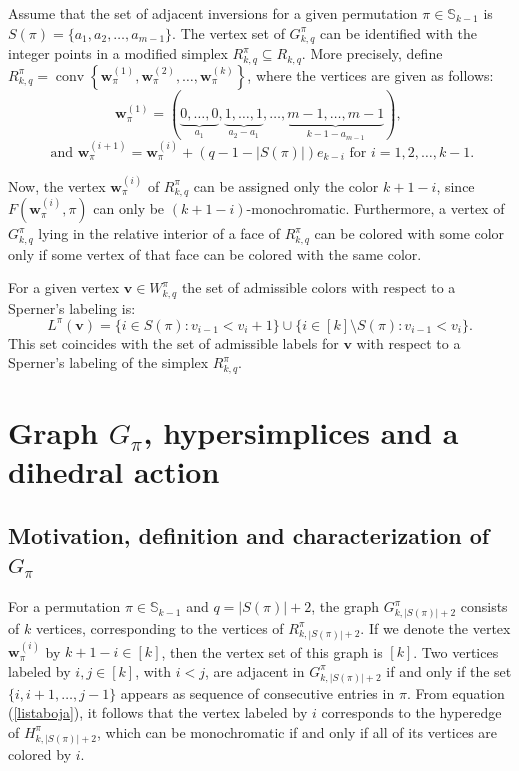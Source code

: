 \documentclass{birkjour}
\theoremstyle{definition}
\theoremstyle{remark}
\numberwithin{equation}{section}
\begin{document}
\noindent Assume that the set of adjacent inversions for a given
permutation $\pi\in \mathbb{S}_{k-1}$ is
$S(\pi)=\{a_1,a_2,\ldots,a_{m-1}\}$. The vertex set of
$G^\pi_{k,q}$ can be identified with the integer points in a
modified simplex $R^\pi_{k,q}\subseteq R_{k,q}$. More precisely,
define
$R^\pi_{k,q}=\operatorname{conv}\left\{\mathbf{w}_\pi^{(1)},\mathbf{w}_\pi^{(2)},\ldots,
\mathbf{w}_\pi^{(k)}\right\}$, where the vertices are given as
follows:
$$\mathbf{w}_\pi^{(1)}=(\underbrace{0,\ldots,0}_{a_1},
\underbrace{1,\ldots,1}_{a_2-a_1},\ldots,
\underbrace{m-1,\ldots,m-1}_{k-1-a_{m-1}})\textrm{, }$$
$$\textrm{ and }  \mathbf{w}_\pi^{(i+1)}=\mathbf{w}_\pi^{(i)}+
(q-1-|S(\pi)|)e_{k-i}
\textrm{ for } i=1,2,\ldots,k-1.$$

\noindent Now, the vertex $\mathbf{w}_\pi^{(i)}$ of $R^\pi_{k,q}$
can be assigned only the color $k+1-i$, since
$F(\mathbf{w}_\pi^{(i)},\pi)$
 can only be $(k+1-i)$-monochromatic.
Furthermore, a vertex of $G^\pi_{k,q}$ lying in the
relative interior of a face of $R_{k,q}^\pi$ can be colored with some color
only if some vertex of that face can be colored with the same color.

For a given vertex $\mathbf{v} \in W_{k,q}^\pi$ the set of
admissible colors with respect to a Sperner's labeling is:
\begin{equation}\label{listaboja}
L^\pi(\mathbf{v})=\{i\in S(\pi):v_{i-1}<v_{i}+1\}\cup \{i\in
[k]\setminus S(\pi):v_{i-1}<v_{i}\}.
\end{equation}
This set coincides with the set of admissible labels for
$\mathbf{v}$ with respect to a Sperner's labeling of the simplex
$R_{k,q}^\pi$.


\section{Graph $G_\pi$, hypersimplices and a dihedral action}
\subsection{Motivation, definition and characterization of $G_\pi$}
For a permutation $\pi\in \mathbb{S}_{k-1}$ and $q=|S(\pi)|+2$,
the graph $G^\pi_{k,|S(\pi)|+2}$ consists of $k$ vertices,
corresponding to the vertices of $R^\pi_{k,|S(\pi)|+2}$. If we
denote the vertex $\mathbf{w}_\pi^{(i)}$ by $k+1-i\in [k]$, then
the vertex set of this graph is $[k]$. Two vertices labeled by
$i,j\in [k]$, with $i<j$, are adjacent in $G^\pi_{k,|S(\pi)|+2}$
if and only if the set $\{i,i+1,\ldots,j-1\}$ appears as sequence
of consecutive entries in $\pi$. From equation (\ref{listaboja}),
it follows that the vertex labeled by $i$ corresponds to the
hyperedge of $H^\pi_{k,|S(\pi)|+2}$, which can be monochromatic if
and only if all of its vertices are colored by $i$.
\end{document}
